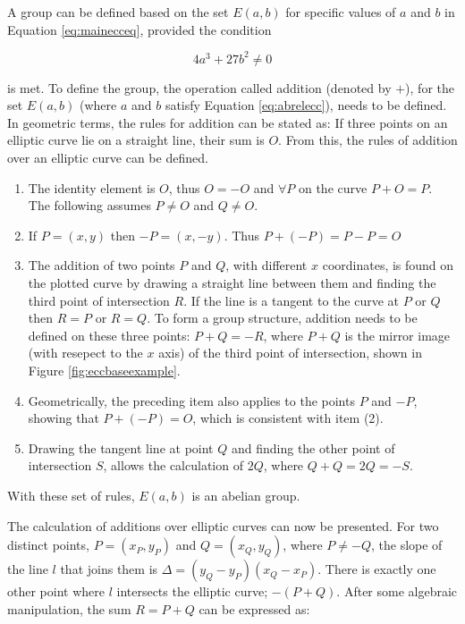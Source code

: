 \documentclass[a4paper,10pt]{report}
\begin{document}
A group can be defined based on the set $E(a,b)$ for specific values of $a$ and $b$ in Equation \ref{eq:mainecceq}, provided the condition

\begin{equation}
 4a^3 + 27b^2 \neq 0
\label{eq:abrelecc}
\end{equation}

is met. To define the group, the operation called addition (denoted by $+$), for the set $E(a,b)$ (where $a$ and $b$ satisfy Equation \ref{eq:abrelecc}), needs to be defined. In geometric terms, the rules for addition can be stated as: If three points on an elliptic curve lie on a straight line, their sum is $O$. From this, the rules of addition over an elliptic curve can be defined. 

\begin{enumerate}
 \item The identity element is $O$, thus $O = -O$ and $\forall P$ on the curve $P + O = P$. The following assumes $P \neq O$ and $Q \neq O$.
 \item If $P = (x,y)$ then $-P = (x,-y)$. Thus $P + (-P) = P - P = O$
 \item The addition of two points $P$ and $Q$, with different $x$ coordinates, is found on the plotted curve by drawing a straight line between them and finding the third point of intersection $R$. If the line is a tangent to the curve at $P$ or $Q$ then $R = P$ or $R = Q$. To form a group structure, addition needs to be defined on these three points: $P + Q = -R$, where $P + Q$ is the mirror image (with resepect to the $x$ axis) of the third point of intersection, shown in Figure \ref{fig:eccbaseexample}. 
 \item Geometrically, the preceding item also applies to the points $P$ and $-P$, showing that $P + (-P) = O$, which is consistent with item (2).
 \item Drawing the tangent line at point $Q$ and finding the other point of intersection $S$, allows the calculation of $2Q$, where $Q + Q = 2Q = -S$.
\end{enumerate}

With these set of rules, $E(a,b)$ is an abelian group. 

The calculation of additions over elliptic curves can now be presented. For two distinct points, $P = (x_{P},y_{P})$ and $Q = (x_{Q},y_{Q})$, where $P \neq -Q$, the slope of the line $l$ that joins them is $\Delta = (y_{Q} - y_{P})$\textfractionsolidus$(x_{Q} - x_{P})$. There is exactly one other point where $l$ intersects the elliptic curve; $-(P + Q)$. After some algebraic manipulation, the sum $R = P + Q$ can be expressed as:
\end{document}
